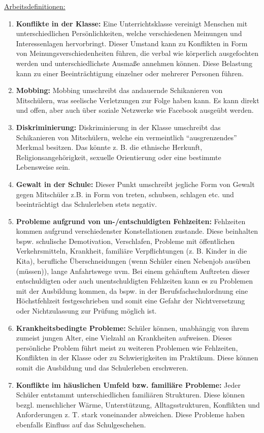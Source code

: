 \noindent
\underline{Arbeitsdefinitionen:}
\begin{enumerate}
	\item \textbf{Konflikte in der Klasse:} Eine Unterrichtsklasse vereinigt Menschen mit unterschiedlichen Persönlichkeiten, welche verschiedenen Meinungen und Interessenlagen hervorbringt. Dieser Umstand kann zu Konflikten in Form von Meinungsverschiedenheiten führen, die verbal wie körperlich ausgefochten werden und unterschiedlichste Ausmaße annehmen können. Diese Belastung kann zu einer Beeinträchtigung einzelner oder mehrerer Personen führen.
	\item \textbf{Mobbing:} Mobbing umschreibt das andauernde Schikanieren von Mitschülern, was seelische Verletzungen zur Folge haben kann. Es kann direkt und offen, aber auch über soziale Netzwerke wie Facebook ausgeübt werden.
	\item \textbf{Diskriminierung:} Diskriminierung in der Klasse umschreibt das Schikanieren von Mitschülern, welche ein vermeintlich "`ausgrenzendes"' Merkmal besitzen. Das könnte z. B. die ethnische Herkunft, Religionsangehörigkeit, sexuelle Orientierung oder eine bestimmte Lebensweise sein.
	\item \textbf{Gewalt in der Schule:} Dieser Punkt umschreibt jegliche Form von Gewalt gegen Mitschüler z.B. in Form von treten, schubsen, schlagen etc. und beeinträchtigt das Schulerleben stets negativ.
	\item \textbf{Probleme aufgrund von un-/entschuldigten Fehlzeiten:} Fehlzeiten kommen aufgrund verschiedenster Konstellationen zustande. Diese beinhalten bspw. schulische Demotivation, Verschlafen, Probleme mit öffentlichen Verkehrsmitteln, Krankheit, familiäre Verpflichtungen (z. B. Kinder in die Kita), berufliche Überschneidungen (wenn Schüler einen Nebenjob ausüben (müssen)), lange Anfahrtswege uvm. Bei einem gehäuftem Auftreten dieser entschuldigten oder auch unentschuldigten Fehlzeiten kann es zu Problemen mit der Ausbildung kommen, da bspw. in der Berufsfachschulordnung eine Höchstfehlzeit festgeschrieben und somit eine Gefahr der Nichtversetzung oder Nichtzulassung zur Prüfung möglich ist.
	\item \textbf{Krankheitsbedingte Probleme:} Schüler können, unabhängig von ihrem zumeist jungen Alter, eine Vielzahl an Krankheiten aufweisen. Dieses persönliche Problem führt meist zu weiteren Problemen wie Fehlzeiten, Konflikten in der Klasse oder zu Schwierigkeiten im Praktikum. Diese können somit die Ausbildung und das Schulerleben erschweren.
	\item \textbf{Konflikte im häuslichen Umfeld bzw. familiäre Probleme:} Jeder Schüler entstammt unterschiedlichen familiären Strukturen. Diese können bezgl. menschlicher Wärme, Unterstützung, Alltagsstrukturen, Konflikten und Anforderungen z. T. stark voneinander abweichen. Diese Probleme haben ebenfalls Einfluss auf das Schulgeschehen. 

\end{enumerate}
